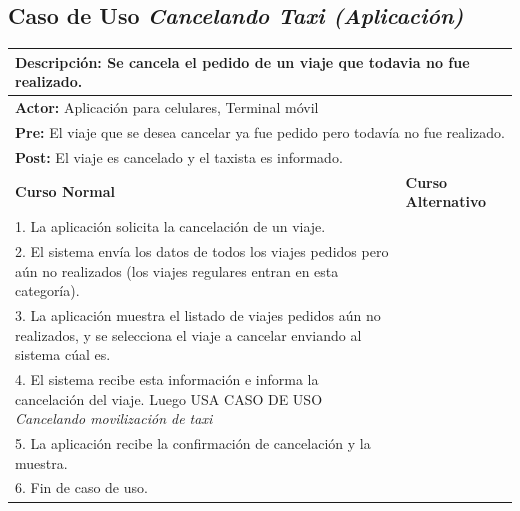 \documentclass[a4paper]{article}
\begin{document}
\subsection{Caso de Uso \textit{Cancelando Taxi (Aplicaci\'on)}}
\begin{center}
\begin{tabular}{|p{10cm} | p{6cm}|}
\hline
\multicolumn{2}{|p{16cm}|}{\textbf{Descripci\'on:} Se cancela el pedido de un viaje que todavia no fue realizado.} \\
\hline
\multicolumn{2}{|l|}{\textbf{Actor:} Aplicaci\'on para celulares, Terminal m\'ovil} \\ %
\hline
\multicolumn{2}{|p{15cm}|}{\textbf{Pre:} El viaje que se desea cancelar ya fue pedido pero todav\'ia no fue realizado. } \\
\hline
\multicolumn{2}{|p{15cm}|}{\textbf{Post:} El viaje es cancelado y el taxista es informado.}\\
\hline
\textbf{Curso Normal}  & \textbf{Curso Alternativo} \\ \hline
1. La aplicaci\'on solicita la cancelaci\'on de un viaje. & \\ \hline
2. El sistema env\'ia los datos de todos los viajes pedidos pero a\'un no realizados (los viajes regulares entran en esta categor\'ia). & \\ \hline
3. La aplicaci\'on muestra el listado de viajes pedidos a\'un no realizados, y se selecciona el viaje a cancelar enviando al sistema c\'ual es. & \\ \hline
4. El sistema recibe esta informaci\'on e informa la cancelaci\'on del viaje. Luego USA CASO DE USO \textit{Cancelando movilizaci\'on de taxi} & \\ \hline %
5. La aplicaci\'on recibe la confirmaci\'on de cancelaci\'on y la muestra. & \\ \hline
6. Fin de caso de uso. & \\ \hline
\end{tabular}
\end{center}
\end{document}

